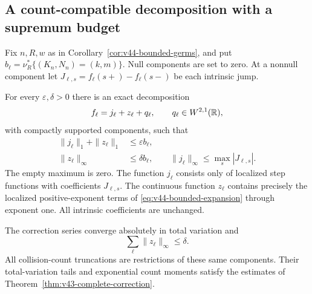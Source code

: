 \subsection{A count-compatible decomposition with a supremum budget}
Fix $n,R,w$ as in Corollary~\ref{cor:v44-bounded-germs}, and put
$b_\ell=\nu_R^*\{(K_n,N_n)=(k,m)\}$. Null components are set to zero.
At a nonnull component let
$J_{\ell,s}=f_\ell(s+)-f_\ell(s-)$ be each intrinsic jump.

\begin{theorem}
\label{thm:v44-jump-cusp-extraction}
For every $\varepsilon,\delta>0$ there is an exact decomposition
\begin{equation}\label{eq:v44-jump-cusp-identity}
 f_\ell=j_\ell+z_\ell+q_\ell,
       \qquad q_\ell\in W^{2,1}(\R),
\end{equation}
with compactly supported components, such that
\begin{align}
 \|j_\ell\|_1+\|z_\ell\|_1&\le\varepsilon b_\ell,
                                            \label{eq:v44-edge-mass}\\
 \|z_\ell\|_\infty&\le\delta b_\ell,
 \qquad \|j_\ell\|_\infty\le\max_s|J_{\ell,s}|.
                                            \label{eq:v44-cusp-height}
\end{align}
The empty maximum is zero. The function $j_\ell$ consists only of
localized step functions with coefficients $J_{\ell,s}$.
The continuous function $z_\ell$ contains precisely the localized
positive-exponent terms of \eqref{eq:v44-bounded-expansion} through
exponent one. All intrinsic coefficients are unchanged.

The correction series converge absolutely in total variation and
\begin{equation}\label{eq:v44-summed-cusp}
 \sum_\ell\|z_\ell\|_\infty\le\delta.
\end{equation}
All collision-count truncations are restrictions of these same
components. Their total-variation tails and exponential count moments
satisfy the estimates of Theorem~\ref{thm:v43-complete-correction}.
\end{theorem}
